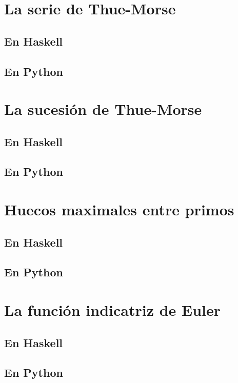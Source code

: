 \documentclass[a4paper,12pt,twoside]{book}
\begin{document}
\section{La serie de Thue-Morse}
\subsection{En Haskell}
\subsection{En Python}

\section{La sucesión de Thue-Morse}
\subsection{En Haskell}
\subsection{En Python}

\section{Huecos maximales entre primos}
\subsection{En Haskell}
\subsection{En Python}

\section{La función indicatriz de Euler}
\subsection{En Haskell}
\subsection{En Python}
\end{document}
